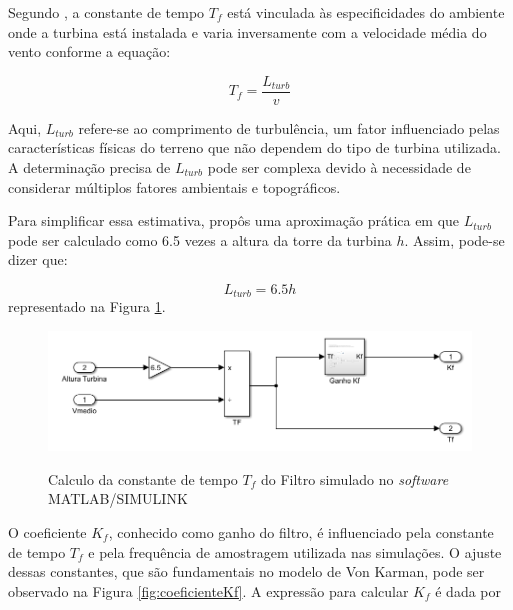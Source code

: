 \par Segundo , a constante de tempo \(T_f\) está vinculada às especificidades do ambiente onde a turbina está instalada e varia inversamente com a velocidade média do vento conforme a equação:

\begin{equation}
T_f = \frac{L_{turb}}{v}
\label{eq:Constante_Tempo_Tf}
\end{equation}

\par Aqui, \(L_{turb}\) refere-se ao comprimento de turbulência, um fator influenciado pelas características físicas do terreno que não dependem do tipo de turbina utilizada. A determinação precisa de \(L_{turb}\) pode ser complexa devido à necessidade de considerar múltiplos fatores ambientais e topográficos.

\par Para simplificar essa estimativa,  propôs uma aproximação prática em que \(L_{turb}\) pode ser calculado como 6.5 vezes a altura da torre da turbina \(h\). Assim, pode-se dizer que:

\begin{equation}
L_{turb} = 6.5h
\label{eq:Comprimentodaturbina_aproxMartins}
\end{equation}
representado na Figura \ref{fig:cal_constante_tempoTf}.

\begin{figure}[h]
    \centering
    \caption{Calculo da constante de tempo $T_f$ do Filtro simulado no \textit{software} MATLAB/SIMULINK}
    \includegraphics[width=\textwidth]{Figuras/Teorico/constante_de_tempoTf.png}
    \label{fig:cal_constante_tempoTf}
    
\end{figure}


\par O coeficiente \(K_f\), conhecido como ganho do filtro, é influenciado pela constante de tempo \(T_f\) e pela frequência de amostragem utilizada nas simulações. O ajuste dessas constantes, que são fundamentais no modelo de Von Karman, pode ser observado na Figura \ref{fig:coeficienteKf}. A expressão para calcular \(K_f\) é dada por

